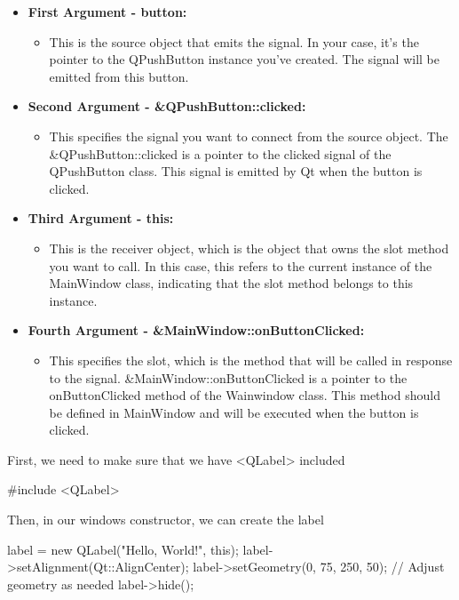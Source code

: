 \documentclass{report}
\begin{document}
    \begin{itemize}
        \item \textbf{First Argument - button:}
            \begin{itemize}
                \item This is the source object that emits the signal. In your case, it's the pointer to the QPushButton instance you've created. The signal will be emitted from this button.
            \end{itemize}
        \item \textbf{Second Argument - \&QPushButton::clicked:}
            \begin{itemize}
                \item  This specifies the signal you want to connect from the source object. The \&QPushButton::clicked is a pointer to the clicked signal of the QPushButton class. This signal is emitted by Qt when the button is clicked.
            \end{itemize}
        \item \textbf{Third Argument - this:}
            \begin{itemize}
               \item This is the receiver object, which is the object that owns the slot method you want to call. In this case, this refers to the current instance of the MainWindow class, indicating that the slot method belongs to this instance.
            \end{itemize}
        \item \textbf{Fourth Argument - \&MainWindow::onButtonClicked:}
            \begin{itemize}
                \item  This specifies the slot, which is the method that will be called in response to the signal. \&MainWindow::onButtonClicked is a pointer to the onButtonClicked method of the Wainwindow class. This method should be defined in MainWindow and will be executed when the button is clicked.
            \end{itemize}
    \end{itemize}

    \pagebreak
    \bigbreak \noindent 
    First, we need to make sure that we have <QLabel> included 
    \bigbreak \noindent 
    \begin{cppcode}
    #include <QLabel>
    \end{cppcode}
    \bigbreak \noindent 
    Then, in our windows constructor, we can create the label
    \bigbreak \noindent 
    \begin{cppcode}
    label = new QLabel("Hello, World!", this);
    label->setAlignment(Qt::AlignCenter);
    label->setGeometry(0, 75, 250, 50); // Adjust geometry as needed
    label->hide();
    \end{cppcode}
\end{document}
